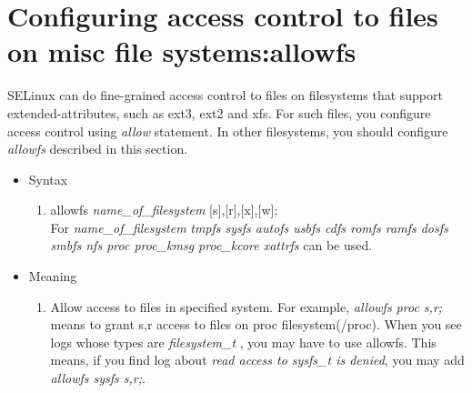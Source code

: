 \documentclass{article}
\begin{document}
\section{Configuring access control to files on misc file systems:allowfs}
 SELinux can do fine-grained access control to files on filesystems that
 support extended-attributes, such as ext3, ext2 and xfs. For such files,
 you configure access control using {\it allow} statement. In other
 filesystems, you should configure {\it allowfs} described in this
 section.

\begin{itemize}
 \item Syntax
       \begin{enumerate}
	\item  allowfs {\it name\_of\_filesystem} [s],[r],[x],[w];\\
	       For {\it name\_of\_filesystem} {\it tmpfs sysfs autofs usbfs cdfs romfs
	       ramfs dosfs smbfs nfs proc proc\_kmsg proc\_kcore xattrfs} can be
	       used.
       \end{enumerate}      
 \item Meaning\\
       \begin{enumerate}

	\item Allow access to files in specified system. For example, {\it
	      allowfs proc s,r;} means to grant s,r access to files on proc
	      filesystem(/proc). When you see logs whose types are {\it
	      filesystem\_t }, you may have to use allowfs. This means, if you
	      find log about {\it read access to sysfs\_t is denied}, you may
	      add {\it allowfs sysfs s,r;}.
		
       \end{enumerate}
       


\end{itemize}
\end{document}
